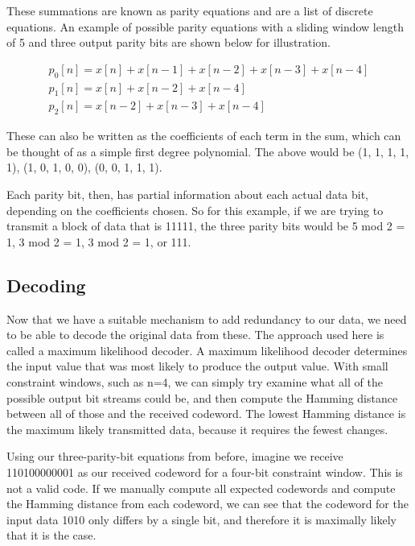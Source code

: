 \documentclass[12pt]{article}
\begin{document}
These summations are known as parity equations and are a list of discrete equations. An example of possible parity equations with a sliding window length of 5 and three output parity bits are shown below for illustration.

\begin{equation}
  \begin{array}{l}
	p_0[n] = x[n] + x[n-1] + x[n-2] + x[n-3] + x[n-4] \\
	p_1[n] = x[n] + x[n-2] + x[n-4]  \\
	p_2[n] = x[n-2] + x[n-3] + x[n-4]
  \end{array} 
\end{equation}

These can also be written as the coefficients of each term in the sum, which can be thought of as a simple first degree polynomial. The above would be (1, 1, 1, 1, 1), (1, 0, 1, 0, 0), (0, 0, 1, 1, 1).

Each parity bit, then, has partial information about each actual data bit, depending on the coefficients chosen. So for this example, if we are trying to transmit a block of data that is 11111, the three parity bits would be 5 mod 2 = 1, 3 mod 2 = 1, 3 mod 2 = 1, or 111. \cite{rsg}

\subsection{Decoding}

Now that we have a suitable mechanism to add redundancy to our data, we need to be able to decode the original data from these. The approach used here is called a maximum likelihood decoder. A maximum likelihood decoder determines the input value that was most likely to produce the output value. With small constraint windows, such as n=4, we can simply try examine what all of the possible output bit streams could be, and then compute the Hamming distance between all of those and the received codeword. The lowest Hamming distance is the maximum likely transmitted data, because it requires the fewest changes.

Using our three-parity-bit equations from before, imagine we receive 110100000001 as our received codeword for a four-bit constraint window. This is not a valid code. If we manually compute all expected codewords and compute the Hamming distance from each codeword, we can see that the codeword for the input data 1010 only differs by a single bit, and therefore it is maximally likely that it is the case. \cite{rsg}
\end{document}

